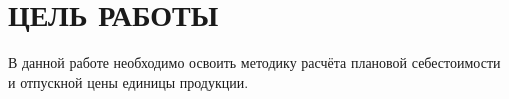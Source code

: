 \section{ЦЕЛЬ РАБОТЫ}

В данной работе необходимо освоить методику расчёта плановой себестоимости
и отпускной цены единицы продукции.

\newpage
